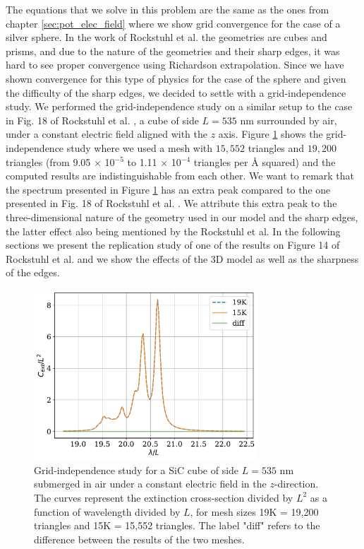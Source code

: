 The equations that we solve in this problem are the same as the ones from chapter \ref{sec:pot_elec_field} where we show grid convergence for the case of 
a silver sphere. In the work of Rockstuhl et al. \cite{rockstuhl2005} the geometries are cubes and prisms, and due to the nature of the geometries 
and their sharp edges, it was hard to see proper convergence using Richardson extrapolation. Since we have shown convergence for this type of physics
for the case of the sphere and given the difficulty of the sharp edges, we decided to settle with a grid-independence study. We performed the grid-independence study
on a similar setup to the case in Fig. 18 of Rockstuhl et al. \cite{rockstuhl2005}, a cube of side $L=535$ nm surrounded by air, under a constant electric field 
aligned with the $z$ axis. Figure \ref{fig:cube535} shows the grid-independence study where we used a mesh with $15,552$ triangles and $19,200$ triangles 
(from 9.05 $\times$ 10$^{-5}$ to 1.11 $\times$ 10$^{-4}$ triangles per $\text{\AA}$ squared) and the computed results are indistinguishable from each other.
We want to remark that the spectrum presented in Figure \ref{fig:cube535} has an extra peak compared to the one presented in Fig. 18 of Rockstuhl
et al. \cite{rockstuhl2005}. We attribute this extra peak to the three-dimensional nature of the geometry used in our model and the sharp edges, the
latter effect also being mentioned by the Rockstuhl et al. In the following sections we present the replication study of one of the results on 
Figure 14 of Rockstuhl et al. and we show the effects of the 3D model as well as the sharpness of the edges. 

\begin{figure}[h]
    \centering
    \includegraphics[width=0.75\textwidth]{cubeL535nm_15Kvs19K.pdf} 
    \caption{Grid-independence study for a SiC cube of side $L=535$ nm submerged in air under a constant 
    electric field in the $z$-direction. The curves represent the extinction cross-section divided by $L^2$ 
    as a function of wavelength divided by $L$, for mesh sizes 19K = 19,200 triangles and 15K = 15,552 triangles. 
    The label "diff" refers to the difference between the results of the two meshes.}
    \label{fig:cube535}
 \end{figure}

